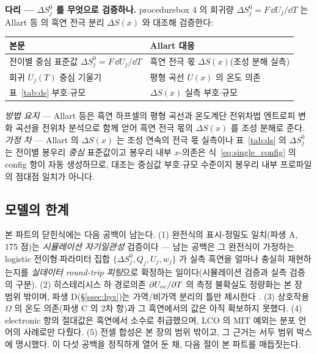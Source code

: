 \begin{srcbox}
\textbf{다리 --- $\Delta S^0_j$ 를 무엇으로 검증하나.} procedurebox 4 의 회귀량 $\Delta S^0_j=F\,\dd
U_j/\dd T$ 는 Allart 등\cite{allart2018} 의 흑연 전극 분리 $\Delta S(x)$ 와 대조해 검증한다:
\begin{center}\footnotesize
\begin{tabular}{@{}ll@{}}
\hline
본문 & Allart\cite{allart2018} 대응 \\
\hline
전이별 중심 표준값 $\Delta S^0_j=F\,\dd U_j/\dd T$ & 흑연 전극 몫 $\Delta S(x)$(조성 분해 실측) \\
회귀 $U_j(T)$ 중심 기울기 & 평형 곡선 $U(x)$ 의 온도 의존 \\
표~\ref{tab:ds} 부호$\cdot$규모 & $\Delta S(x)$ 실측 부호$\cdot$규모 \\
\hline
\end{tabular}
\end{center}
\emph{방법 요지} --- Allart 등은 흑연 하프셀의 평형 곡선과 온도계단 전위차법 엔트로피 변화 곡선을 전위차
분석으로 함께 얻어 흑연 전극 몫의 $\Delta S(x)$ 를 조성 분해로 준다. \emph{가정 차} --- Allart 의 $\Delta S(x)$
는 조성 연속의 전극 몫 실측이나 표~\ref{tab:ds} 의 $\Delta S^0_j$ 는 전이별 봉우리 \emph{중심} 표준값이고
봉우리 내부 $x$-의존은 식~\eqref{eq:single_config} 의 config 항이 자동 생성하므로, 대조는 중심값
부호$\cdot$규모 수준이지 봉우리 내부 프로파일의 점대점 일치가 아니다.
\end{srcbox}

\subsection{모델의 한계}\label{ssec:gaps}
본 파트의 닫힌식에는 다음 공백이 남는다. (1) 완전식의 표시-정밀도 일치(파생 A, 175 점)는 \emph{시뮬레이션
자기일관성} 검증이다 --- 남는 공백은 그 완전식이 가정하는 logistic 전이형$\cdot$파라미터 집합
$\{\Delta S^0_j,Q_j,U_j,w_j\}$ 가 실측 흑연을 얼마나 충실히 재현하는지를 \emph{실데이터 round-trip 피팅}으로
확정하는 일이다(시뮬레이션 검증과 실측 검증의 구분). (2) 히스테리시스 하 경로의존 $\partial U_{\mathrm{oc}}/\partial T$ 의
측정 불확실도 정량화는 본 장 범위 밖이며, 파생 D(\S\ref{ssec:hys})는 가역/비가역 분리의 틀만 제시한다
\cite{hysteresis2018}. (3) 상호작용 $\Omega$ 의 온도 의존(파생 C 의 2차 항)과 그 흑연에서의 값은 아직
확보하지 못했다. (4) electronic 항의 절대값은 흑연에서 소수로 취급했으며, LCO 의 MIT 예외는 분포 언어의
사례로만 다뤘다. (5) 전셀 합성은 본 장의 범위 밖이고, 그 근거는 서두 범위 박스에 명시했다. 이 다섯 공백을
정직하게 열어 둔 채, 다음 절이 본 파트를 매듭짓는다.

